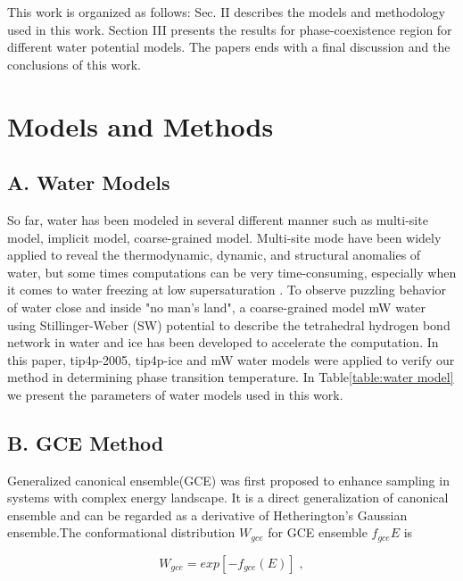 \documentclass[aps,prl,twocolumn,superscriptaddress]{revtex4-1}
\begin{document}
This work is organized as follows: Sec. II describes the models and methodology used in this work. Section III presents the results for phase-coexistence region for different water potential models. The papers ends with a final discussion and the conclusions of this work.
\section{Models and Methods} 
\subsection{A. Water Models}
So far, water has been modeled in several different manner such as multi-site model\cite{Sanz2004,Bryk2002,Horn2005,Gonzalez2010,Kumar2012,Sedlmeier2011,Vega2007,Yu2013,Himoto2011}, implicit model\cite{Huißmann2012}, coarse-grained model\cite{Molinero2009,Marrink2004Coarse}. Multi-site mode have been widely applied to reveal the thermodynamic, dynamic, and structural anomalies of water\cite{Gao2000,Bryk2002,Sanz2004}, but some times computations can be very time-consuming, especially when it comes to water freezing at low supersaturation\cite{Mishima1998} . To observe puzzling behavior of water close and inside "no man's land"\cite{Moore2011}, a coarse-grained model mW water\cite{Molinero2009} using Stillinger-Weber (SW) potential to describe the tetrahedral hydrogen bond network in water and ice has been developed to accelerate the computation. In this paper, tip4p-2005, tip4p-ice and mW water models were applied to verify our method in determining phase transition temperature. In Table\ref{table:water model}  we present the parameters of water models used in this work. 

\subsection{B. GCE Method}

Generalized canonical ensemble(GCE)\cite{Xu2012} was first proposed to enhance sampling in systems with complex energy landscape. It is a direct generalization of canonical ensemble and can be regarded as a derivative of Hetherington's Gaussian ensemble.The conformational distribution $W_{gce}$ for GCE ensemble $f_{gce}{E}$ is

\begin{equation}
W_{gce}=exp[−f_{gce}(E)]\;,
\end{equation}
\end{document}
